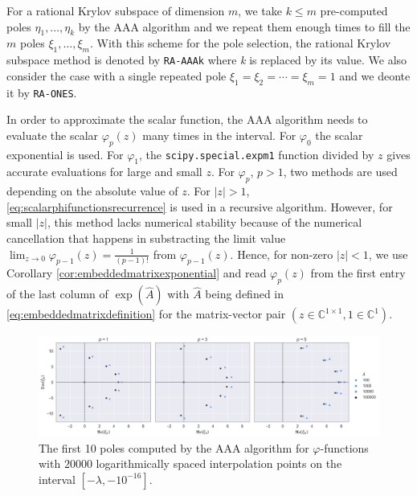 For a rational Krylov subspace of dimension $m$, we take $k \le m$ pre-computed poles $\eta_1, \dots, \eta_k$
by the AAA algorithm and we repeat them enough times to fill the $m$ poles $\xi_1, \dots, \xi_m$.
With this scheme for the pole selection, the rational Krylov subspace method is denoted by
\texttt{RA-AAAk} where \textit{k} is replaced by its value.
We also consider the case with a single repeated pole $\xi_1 = \xi_2 = \cdots = \xi_{m} = 1$ and
we deonte it by \texttt{RA-ONES}.

\begin{remark}
    In order to approximate the scalar function, the AAA algorithm needs to evaluate the scalar
    $\varphi_p(z)$ many times in the interval.
    For $\varphi_0$ the scalar exponential is used. For $\varphi_1$, the \texttt{scipy.special.expm1}
    function divided by $z$ gives accurate evaluations for large and small $z$.
    For $\varphi_p$, $p > 1$, two methods are used depending on the absolute value of $z$.
    For $|z| > 1$, \eqref{eq:scalarphifunctionsrecurrence} is used in a recursive algorithm.
    However, for small $|z|$, this method lacks numerical stability because of the numerical
    cancellation that happens in substracting the limit value
    $\lim_{z \to 0}\varphi_{p-1}(z) = \frac{1}{(p-1)!}$ from $\varphi_{p-1}(z)$.
    Hence, for non-zero $|z| < 1$, we use Corollary \ref{cor:embeddedmatrixexponential} and read $\varphi_p(z)$
    from the first entry of the last column of $\exp(\hat{A})$ with $\hat{A}$ being defined in
    \eqref{eq:embeddedmatrixdefinition} for the matrix-vector pair
    $(z \in \mathbb{C}^{1 \times 1}, 1 \in \mathbb{C}^{1})$.
\end{remark}

\begin{figure}[h!]
    \centering
    \includegraphics[width=.9\textwidth]{img/AAA/poles_lambda_log20k_m10.png}
    \caption{
        The first 10 poles computed by the AAA algorithm for $\varphi$-functions with $20000$
        logarithmically spaced interpolation points on the interval $[-\lambda, -10^{-16}]$.
    }
    \label{fig:polesAAA}
\end{figure}

